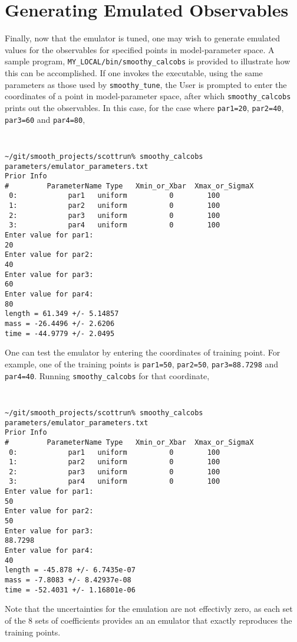 \documentclass[UserManual.tex]{subfiles}
\begin{document}
\section{Generating Emulated Observables}
Finally, now that the emulator is tuned, one may wish to generate emulated values for the observables for specified points in model-parameter space. A sample program, {\tt MY\_LOCAL/bin/smoothy\_calcobs} is provided to illustrate how this can be accomplished. If one invokes the executable, using the same parameters as those used by {\tt smoothy\_tune}, the User is prompted to enter the coordinates of a point in model-parameter space, after which {\tt smoothy\_calcobs} prints out the observables. In this case, for the case where {\tt par1=20}, {\tt par2=40}, {\tt par3=60} and {\tt par4=80},

{\tt
\begin{verbatim}
~/git/smooth_projects/scottrun% smoothy_calcobs parameters/emulator_parameters.txt
Prior Info
#         ParameterName Type   Xmin_or_Xbar  Xmax_or_SigmaX
 0:            par1   uniform          0        100
 1:            par2   uniform          0        100
 2:            par3   uniform          0        100
 3:            par4   uniform          0        100
Enter value for par1:
20
Enter value for par2:
40
Enter value for par3:
60
Enter value for par4:
80
length = 61.349 +/- 5.14857
mass = -26.4496 +/- 2.6206
time = -44.9779 +/- 2.0495
\end{verbatim}
}

One can test the emulator by entering the coordinates of training point. For example, one of the training points is {\tt par1=50}, {\tt par2=50}, {\tt par3=88.7298} and {\tt par4=40}. Running {\tt smoothy\_calcobs} for that coordinate,

{\tt
\begin{verbatim}
~/git/smooth_projects/scottrun% smoothy_calcobs parameters/emulator_parameters.txt
Prior Info
#         ParameterName Type   Xmin_or_Xbar  Xmax_or_SigmaX
 0:            par1   uniform          0        100
 1:            par2   uniform          0        100
 2:            par3   uniform          0        100
 3:            par4   uniform          0        100
Enter value for par1:
50
Enter value for par2:
50
Enter value for par3:
88.7298
Enter value for par4:
40
length = -45.878 +/- 6.7435e-07
mass = -7.8083 +/- 8.42937e-08
time = -52.4031 +/- 1.16801e-06
\end{verbatim}
}
Note that the uncertainties for the emulation are not effectivly zero, as each set of the 8 sets of coefficients provides an an emulator that exactly reproduces the training points.
\end{document}
